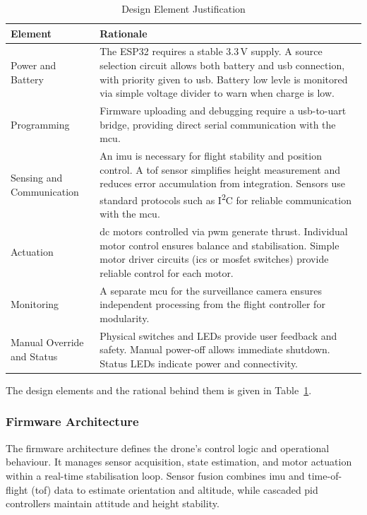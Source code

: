 \renewcommand{\arraystretch}{1.2}
\begin{table}[H]
\centering
\caption{Design Element Justification}
\label{tab:hardware-justification}
\begin{tabular}{|p{}|p{}|}
\hline
\rowcolor{gray!15}
\textbf{Element} & \textbf{Rationale} \\
\hline
Power and Battery & The ESP32 requires a stable 3.3\,V supply. A source selection circuit allows both battery and \gls{usb} connection, with priority given to \gls{usb}. Battery low levle is monitored via simple voltage divider to warn when charge is low. \\
\hline
Programming & Firmware uploading and debugging require a \gls{usb}-to-\gls{uart} bridge, providing direct serial communication with the \gls{mcu}. \\
\hline
Sensing and Communication & An \gls{imu} is necessary for flight stability and position control. A \gls{tof} sensor simplifies height measurement and reduces error accumulation from integration. Sensors use standard protocols such as I\textsuperscript{2}C for reliable communication with the \gls{mcu}. \\
\hline
Actuation & \gls{dc} motors controlled via \gls{pwm} generate thrust. Individual motor control ensures balance and stabilisation. Simple motor driver circuits (\glspl{ic} or \gls{mosfet} switches) provide reliable control for each motor. \\
\hline
Monitoring & A separate \gls{mcu} for the surveillance camera ensures independent processing from the flight controller for modularity. \\
\hline
Manual Override and Status & Physical switches and LEDs provide user feedback and safety. Manual power-off allows immediate shutdown. Status LEDs indicate power and connectivity. \\
\hline
\end{tabular}
\end{table}

The design elements and the rational behind them is given in Table~\ref{tab:hardware-justification}.

\subsubsection{Firmware Architecture}
The firmware architecture defines the drone’s control logic and operational behaviour. It manages sensor acquisition, state estimation, and motor actuation within a real-time stabilisation loop. Sensor fusion combines \gls{imu} and time-of-flight (\gls{tof}) data to estimate orientation and altitude, while cascaded \gls{pid} controllers maintain attitude and height stability.  

